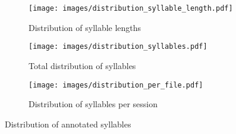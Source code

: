 \documentclass[../CLthesis.tex]{subfiles}
\begin{document}
\begin{figure}[htbp]
   \centering
   \begin{subfigure}[b]{0.85\textwidth}
       \centering
       \texttt{[image: images/distribution\_syllable\_length.pdf]}
       \caption{Distribution of syllable lengths}
       \label{fig:length_distribution}
   \end{subfigure}
   
   \begin{subfigure}[b]{0.85\textwidth}
       \centering
       \texttt{[image: images/distribution\_syllables.pdf]}
       \caption{Total distribution of syllables}
       \label{fig:syllable_distribution}
   \end{subfigure}

   \begin{subfigure}[b]{0.85\textwidth}
       \centering
       \texttt{[image: images/distribution\_per\_file.pdf]}
        \caption{Distribution of syllables per session}
       \label{fig:distributionFile}
   \end{subfigure}
    \caption{Distribution of annotated syllables}
   \label{fig:distribution_syllable}
\end{figure}


\subfilebibliography
\end{document}
